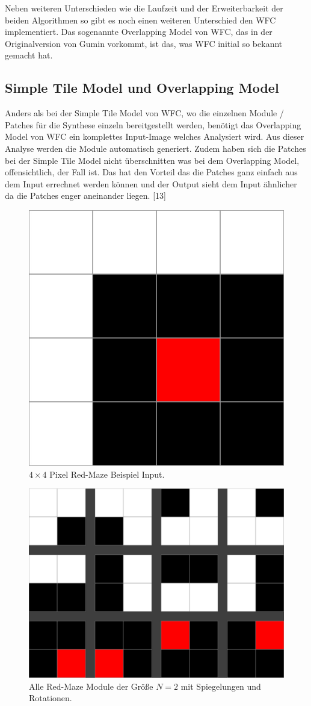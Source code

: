 \documentclass[12pt]{report}
\begin{document}
Neben weiteren Unterschieden wie die Laufzeit und der Erweiterbarkeit der beiden Algorithmen so gibt es noch einen weiteren Unterschied den WFC implementiert.
Das sogenannte Overlapping Model von WFC, das in der Originalversion von Gumin vorkommt, ist das, was WFC initial so bekannt gemacht hat.

\subsection{Simple Tile Model und Overlapping Model}

Anders als bei der Simple Tile Model von WFC, wo die einzelnen Module / Patches für die Synthese einzeln bereitgestellt werden,
benötigt das Overlapping Model von WFC ein komplettes Input-Image welches Analysiert wird.
Aus dieser Analyse werden die Module automatisch generiert.
Zudem haben sich die Patches bei der Simple Tile Model nicht überschnitten was bei dem Overlapping Model, offensichtlich, der Fall ist.
Das hat den Vorteil das die Patches ganz einfach aus dem Input errechnet werden können und der Output sieht dem Input ähnlicher da die Patches enger aneinander liegen. {[13]}

\begin{figure}[H]
    \centering
    \includegraphics[width=0.5\linewidth]{images/red-maze.jpg}%
    \caption{$4\times 4$ Pixel Red-Maze Beispiel Input.}%
\end{figure}


\begin{figure}[H]
    \centering
    \includegraphics[width=0.5\linewidth]{images/red-maze-modules.jpg}%
    \caption{Alle Red-Maze Module der Größe $N = 2$ mit Spiegelungen und Rotationen.}%
\end{figure}
\end{document}
